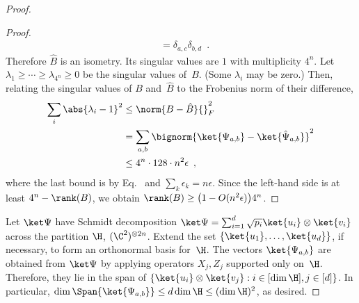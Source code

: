 \documentclass[11pt]{article}
\begin{document}
\begin{proof}
\begin{proof}
\begin{align*}
&= \delta_{a,c} \delta_{b,d}
 \enspace .
\end{align*}
Therefore $\hat B$ is an isometry.  Its singular values are $1$ with multiplicity $4^n$.  Let $\lambda_1 \geq \cdots \geq \lambda_{4^n} \geq 0$ be the singular values of~$B$.  (Some $\lambda_i$ may be zero.)  Then, relating the singular values of $B$ and~$\hat B$ to the Frobenius norm of their difference, 
\begin{align*}
\sum_i \abs{\lambda_i - 1}^2 
&\leq \norm{B - \hat B}{}_F^2 \\
&= \sum_{a,b} \bignorm{\ket{\Psi_{a,b}} - \ket{\hat \Psi_{a,b}}}^2 \\
&\leq 4^n \cdot 128 \cdot n^2 \epsilon
 \enspace ,
\end{align*}
where the last bound is by Eq.~ and $\sum_k \epsilon_k = n \epsilon$.  Since the left-hand side is at least $4^n - \rank(B)$, we obtain $\rank(B) \geq \big( 1 - O(n^2 \epsilon) \big) 4^n$.  
\end{proof}

Let $\ket \Psi$ have Schmidt decomposition $\ket \Psi = \sum_{i = 1}^{d} \sqrt{p_i} \ket{u_i} \otimes \ket{v_i}$ across the partition $\H$, $(\C^2)^{\otimes 2 n}$.  Extend the set $\{\ket{u_1}, \ldots, \ket{u_d}\}$, if necessary, to form an orthonormal basis for~$\H$.  The vectors $\ket{\Psi_{a,b}}$ are obtained from $\ket \Psi$ by applying operators $X_j, Z_j$ supported only on~$\H$.  Therefore, they lie in the span of $\{ \ket{u_i} \otimes \ket{v_j} : i \in [\dim \H], j \in [d] \}$.  In particular, $\dim \Span \{\ket{\Psi_{a,b}}\} \leq d \dim \H \leq (\dim \H)^2$, as desired.  
\end{proof}
\end{document}
